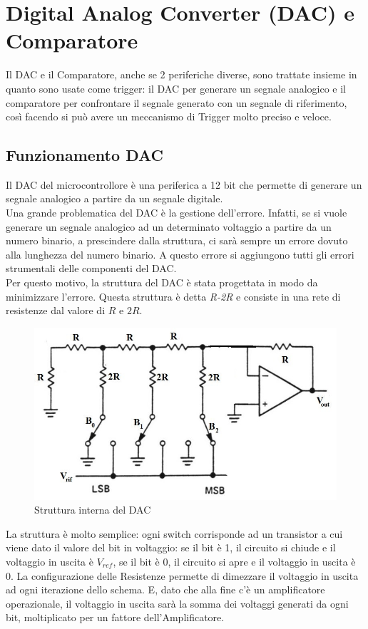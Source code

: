 \pagebreak
\section{Digital Analog Converter (DAC) e Comparatore}
\label{DAC}
Il DAC e il Comparatore, anche se 2 periferiche diverse, sono trattate insieme in quanto sono usate come trigger: il DAC per generare un segnale analogico e il comparatore per confrontare il segnale generato con un segnale di riferimento, così facendo si può avere un meccanismo di Trigger molto preciso e veloce.\\

\subsection{Funzionamento DAC}

Il DAC del microcontrollore è una periferica a 12 bit che permette di generare un segnale analogico a partire da un segnale digitale.\\ 
Una grande problematica del DAC è la gestione dell'errore. Infatti, se si vuole generare un segnale analogico ad un determinato voltaggio a partire da un numero binario, a prescindere dalla struttura, ci sarà sempre un errore dovuto alla lunghezza del numero binario. A questo errore si aggiungono tutti gli errori strumentali delle componenti del DAC.\\

Per questo motivo, la struttura del DAC è stata progettata in modo da minimizzare l'errore. Questa struttura è detta \textit{R-2R} e consiste in una rete di resistenze dal valore di $R$ e $2R$.

\begin{figure}[h]
    \centering
    \includegraphics[width=0.7\linewidth]{microcontrollore/assets/DACr2r.jpg}
    \caption{Struttura interna del DAC}
    \label{fig:DAC}
\end{figure}

La struttura è molto semplice: ogni switch corrisponde ad un transistor a cui viene dato il valore del bit in voltaggio: se il bit è 1, il circuito si chiude e il voltaggio in uscita è $V_{ref}$, se il bit è 0, il circuito si apre e il voltaggio in uscita è 0. La configurazione delle Resistenze permette di dimezzare il voltaggio in uscita ad ogni iterazione dello schema. E, dato che alla fine c'è un amplificatore operazionale, il voltaggio in uscita sarà la somma dei voltaggi generati da ogni bit, moltiplicato per un fattore dell'Amplificatore.\\

